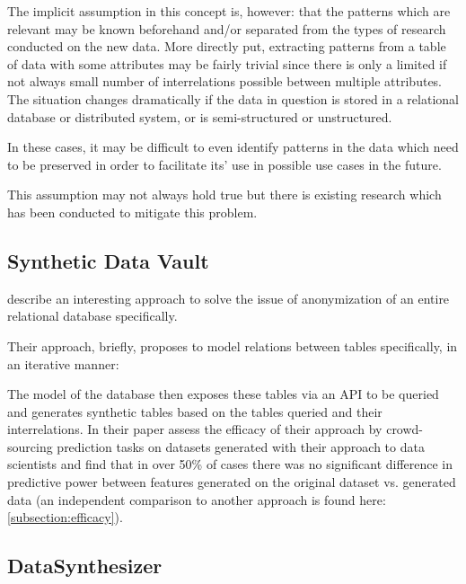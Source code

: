 The implicit assumption in this concept is, however: that the patterns which are relevant may be known beforehand and/or separated from the types of research conducted on the new data. More directly put, extracting patterns from a table of data with some attributes may be fairly trivial since there is only a limited if not always small number of interrelations possible between multiple attributes. 
The situation changes dramatically if the data in question is stored in a relational database or distributed system, or is semi-structured or unstructured.

In these cases, it may be difficult to even identify patterns in the data which need to be preserved in order to facilitate its' use in possible use cases in the future.

This assumption may not always hold true but there is existing research which has been conducted to mitigate this problem.

\pagebreak

\subsection{Synthetic Data Vault}

\cite{patki2016synthetic} describe an interesting approach to solve the issue of anonymization of an entire relational database specifically. 

Their approach, briefly, proposes to model relations between tables specifically, in an iterative manner:


The model of the database then exposes these tables via an \ac{API} to be queried and generates synthetic tables based on the tables queried and their interrelations.
In their paper \cite{patki2016synthetic} assess the efficacy of their approach by crowd-sourcing prediction tasks on datasets generated with their approach to data scientists and find that in over 50\% of cases 
there was no significant difference in predictive power between features generated on the original dataset vs. generated data (an independent comparison to another approach is found here: \ref{subsection:efficacy}).

\pagebreak

\subsection{DataSynthesizer}


